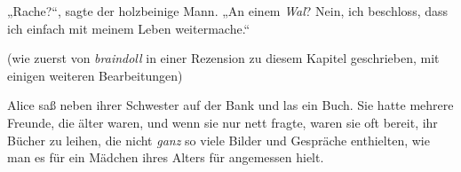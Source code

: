 {%
„Rache?“, sagte der holzbeinige Mann. „An einem \emph{Wal}? Nein, ich beschloss, dass ich einfach mit meinem Leben weitermache.“

(wie zuerst von \emph{braindoll} in einer Rezension zu diesem Kapitel geschrieben, mit einigen weiteren Bearbeitungen)

Alice saß neben ihrer Schwester auf der Bank und las ein Buch. Sie hatte mehrere Freunde, die älter waren, und wenn sie nur nett fragte, waren sie oft bereit, ihr Bücher zu leihen, die nicht \emph{ganz} so viele Bilder und Gespräche enthielten, wie man es für ein Mädchen ihres Alters für angemessen hielt.

}
